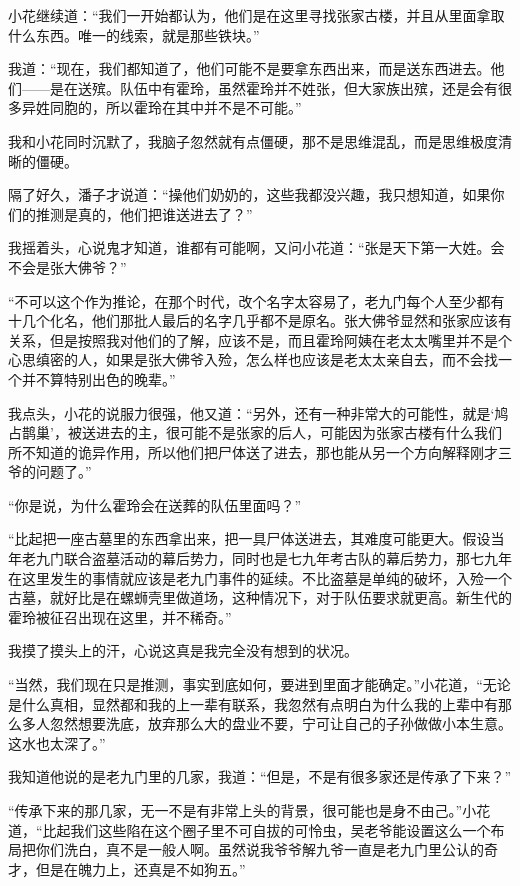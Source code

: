 小花继续道：“我们一开始都认为，他们是在这里寻找张家古楼，并且从里面拿取什么东西。唯一的线索，就是那些铁块。”

我道：“现在，我们都知道了，他们可能不是要拿东西出来，而是送东西进去。他们——是在送殡。队伍中有霍玲，虽然霍玲并不姓张，但大家族出殡，还是会有很多异姓同胞的，所以霍玲在其中并不是不可能。”

我和小花同时沉默了，我脑子忽然就有点僵硬，那不是思维混乱，而是思维极度清晰的僵硬。

隔了好久，潘子才说道：“操他们奶奶的，这些我都没兴趣，我只想知道，如果你们的推测是真的，他们把谁送进去了？”

我摇着头，心说鬼才知道，谁都有可能啊，又问小花道：“张是天下第一大姓。会不会是张大佛爷？”

“不可以这个作为推论，在那个时代，改个名字太容易了，老九门每个人至少都有十几个化名，他们那批人最后的名字几乎都不是原名。张大佛爷显然和张家应该有关系，但是按照我对他们的了解，应该不是，而且霍玲阿姨在老太太嘴里并不是个心思缜密的人，如果是张大佛爷入殓，怎么样也应该是老太太亲自去，而不会找一个并不算特别出色的晚辈。”

我点头，小花的说服力很强，他又道：“另外，还有一种非常大的可能性，就是‘鸠占鹊巢’，被送进去的主，很可能不是张家的后人，可能因为张家古楼有什么我们所不知道的诡异作用，所以他们把尸体送了进去，那也能从另一个方向解释刚才三爷的问题了。”

“你是说，为什么霍玲会在送葬的队伍里面吗？”

“比起把一座古墓里的东西拿出来，把一具尸体送进去，其难度可能更大。假设当年老九门联合盗墓活动的幕后势力，同时也是七九年考古队的幕后势力，那七九年在这里发生的事情就应该是老九门事件的延续。不比盗墓是单纯的破坏，入殓一个古墓，就好比是在螺蛳壳里做道场，这种情况下，对于队伍要求就更高。新生代的霍玲被征召出现在这里，并不稀奇。”

我摸了摸头上的汗，心说这真是我完全没有想到的状况。

“当然，我们现在只是推测，事实到底如何，要进到里面才能确定。”小花道，“无论是什么真相，显然都和我的上一辈有联系，我忽然有点明白为什么我的上辈中有那么多人忽然想要洗底，放弃那么大的盘业不要，宁可让自己的子孙做做小本生意。这水也太深了。”

我知道他说的是老九门里的几家，我道：“但是，不是有很多家还是传承了下来？”

“传承下来的那几家，无一不是有非常上头的背景，很可能也是身不由己。”小花道，“比起我们这些陷在这个圈子里不可自拔的可怜虫，吴老爷能设置这么一个布局把你们洗白，真不是一般人啊。虽然说我爷爷解九爷一直是老九门里公认的奇才，但是在魄力上，还真是不如狗五。”

